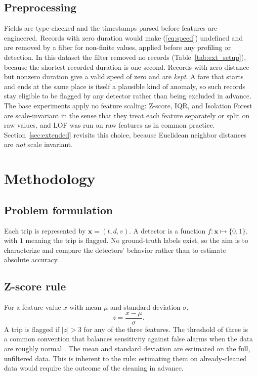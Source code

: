 \documentclass{ieeeaccess}
\begin{document}
\subsection{Preprocessing}
Fields are type-checked and the timestamps parsed before features are engineered. Records with zero duration would make (\ref{eq:speed}) undefined and are removed by a filter for non-finite values, applied before any profiling or detection. In this dataset the filter removed no records (Table~\ref{tab:ext_setup}), because the shortest recorded duration is one second. Records with zero distance but nonzero duration give a valid speed of zero and are \emph{kept}. A fare that starts and ends at the same place is itself a plausible kind of anomaly, so such records stay eligible to be flagged by any detector rather than being excluded in advance.  The base experiments apply no feature scaling: Z-score, IQR, and Isolation Forest are scale-invariant in the sense that they treat each feature separately or split on raw values, and LOF was run on raw features as in common practice. Section~\ref{sec:extended} revisits this choice, because Euclidean neighbor distances are \emph{not} scale invariant.

\section{Methodology}
\label{sec:method}

\subsection{Problem formulation}
Each trip is represented by $\mathbf{x}=(t,d,v)$. A detector is a function $f:\mathbf{x}\mapsto\{0,1\}$, with $1$ meaning the trip is flagged. No ground-truth labels exist, so the aim is to characterize and compare the detectors' behavior rather than to estimate absolute accuracy.

\subsection{Z-score rule}
For a feature value $x$ with mean $\mu$ and standard deviation $\sigma$,
\begin{equation}
z=\frac{x-\mu}{\sigma}.
\end{equation}
A trip is flagged if $|z|>3$ for any of the three features. The threshold of three is a common convention that balances sensitivity against false alarms when the data are roughly normal \cite{agarwal2021}. The mean and standard deviation are estimated on the full, unfiltered data. This is inherent to the rule: estimating them on already-cleaned data would require the outcome of the cleaning in advance.
\end{document}
